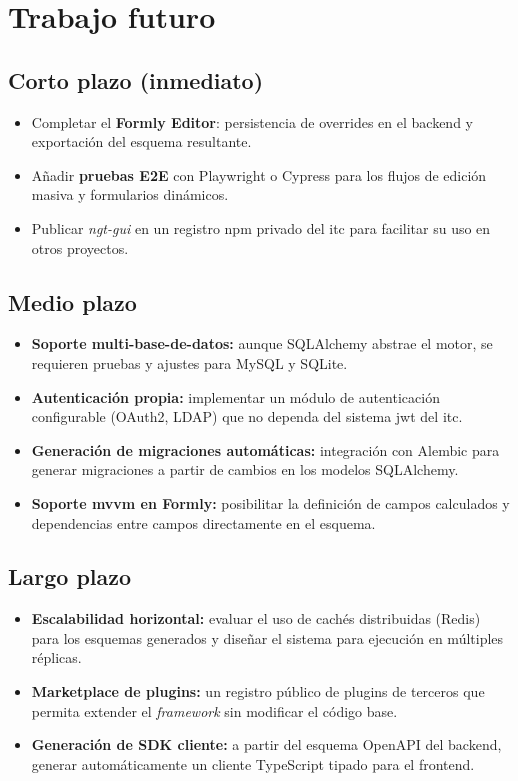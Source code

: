 \section{Trabajo futuro}
\label{sec:trabajo-futuro}

\subsection{Corto plazo (inmediato)}
\label{subsec:cp}

\begin{itemize}
  \item Completar el \textbf{Formly Editor}: persistencia de overrides en el backend y
    exportación del esquema resultante.
  \item Añadir \textbf{pruebas E2E} con Playwright o Cypress para los flujos de
    edición masiva y formularios dinámicos.
  \item Publicar \textit{ngt-gui} en un registro npm privado del \gls{itc} para
    facilitar su uso en otros proyectos.
\end{itemize}

\subsection{Medio plazo}
\label{subsec:mp}

\begin{itemize}
  \item \textbf{Soporte multi-base-de-datos:} aunque SQLAlchemy abstrae el motor, se
    requieren pruebas y ajustes para MySQL y SQLite.
  \item \textbf{Autenticación propia:} implementar un módulo de autenticación
    configurable (OAuth2, LDAP) que no dependa del sistema \gls{jwt} del \gls{itc}.
  \item \textbf{Generación de migraciones automáticas:} integración con Alembic para
    generar migraciones a partir de cambios en los modelos SQLAlchemy.
  \item \textbf{Soporte \gls{mvvm} en Formly:} posibilitar la definición de campos
    calculados y dependencias entre campos directamente en el esquema.
\end{itemize}

\subsection{Largo plazo}
\label{subsec:lp}

\begin{itemize}
  \item \textbf{Escalabilidad horizontal:} evaluar el uso de cachés distribuidas
    (Redis) para los esquemas generados y diseñar el sistema para ejecución en
    múltiples réplicas.
  \item \textbf{Marketplace de plugins:} un registro público de plugins de terceros que
    permita extender el \textit{framework} sin modificar el código base.
  \item \textbf{Generación de SDK cliente:} a partir del esquema OpenAPI del backend,
    generar automáticamente un cliente TypeScript tipado para el frontend.
\end{itemize}
